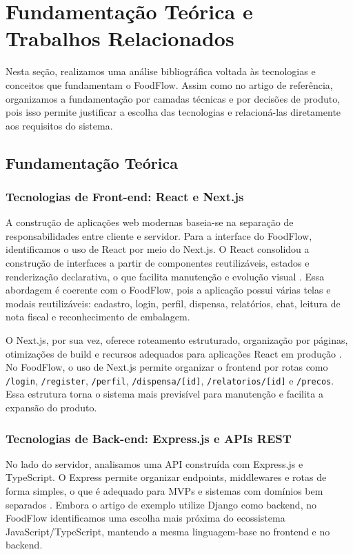 \documentclass[12pt]{article}
\begin{document}
\section{Fundamentação Teórica e Trabalhos Relacionados}

Nesta seção, realizamos uma análise bibliográfica voltada às tecnologias e conceitos que fundamentam o FoodFlow. Assim como no artigo de referência, organizamos a fundamentação por camadas técnicas e por decisões de produto, pois isso permite justificar a escolha das tecnologias e relacioná-las diretamente aos requisitos do sistema.

\subsection{Fundamentação Teórica}

\subsubsection{Tecnologias de Front-end: React e Next.js}

A construção de aplicações web modernas baseia-se na separação de responsabilidades entre cliente e servidor. Para a interface do FoodFlow, identificamos o uso de React por meio do Next.js. O React consolidou a construção de interfaces a partir de componentes reutilizáveis, estados e renderização declarativa, o que facilita manutenção e evolução visual \cite{chen2019}. Essa abordagem é coerente com o FoodFlow, pois a aplicação possui várias telas e modais reutilizáveis: cadastro, login, perfil, dispensa, relatórios, chat, leitura de nota fiscal e reconhecimento de embalagem.

O Next.js, por sua vez, oferece roteamento estruturado, organização por páginas, otimizações de build e recursos adequados para aplicações React em produção \cite{prabakar2025}. No FoodFlow, o uso de Next.js permite organizar o frontend por rotas como \texttt{/login}, \texttt{/register}, \texttt{/perfil}, \texttt{/dispensa/[id]}, \texttt{/relatorios/[id]} e \texttt{/precos}. Essa estrutura torna o sistema mais previsível para manutenção e facilita a expansão do produto.

\subsubsection{Tecnologias de Back-end: Express.js e APIs REST}

No lado do servidor, analisamos uma API construída com Express.js e TypeScript. O Express permite organizar endpoints, middlewares e rotas de forma simples, o que é adequado para MVPs e sistemas com domínios bem separados \cite{express}. Embora o artigo de exemplo utilize Django como backend, no FoodFlow identificamos uma escolha mais próxima do ecossistema JavaScript/TypeScript, mantendo a mesma linguagem-base no frontend e no backend.
\end{document}
